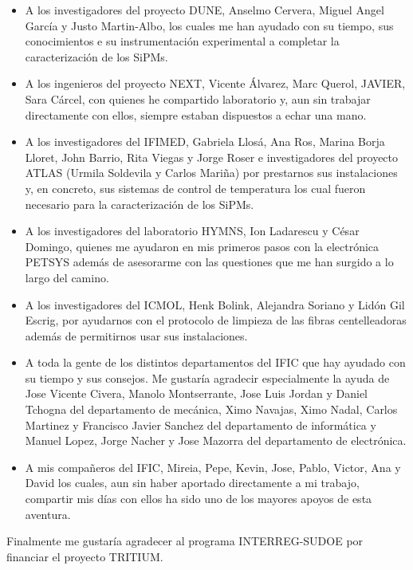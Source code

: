 \begin{itemize}

\item{} A los investigadores del proyecto DUNE, Anselmo Cervera, Miguel Angel García y Justo Martin-Albo, los cuales me han ayudado con su tiempo, sus conocimientos e su instrumentación experimental a completar la caracterización de los SiPMs. 

\item{} A los ingenieros del proyecto NEXT, Vicente Álvarez, Marc Querol, JAVIER, Sara Cárcel, con quienes he compartido laboratorio y, aun sin trabajar directamente con ellos, siempre estaban dispuestos a echar una mano. 

\item{} A los investigadores del IFIMED, Gabriela Llosá, Ana Ros, Marina Borja Lloret, John Barrio, Rita Viegas y Jorge Roser e investigadores del proyecto ATLAS (Urmila Soldevila y Carlos Mariña) por prestarnos sus instalaciones y, en concreto, sus sistemas de control de temperatura los cual fueron necesario para la caracterización de los SiPMs. 

\item{} A los investigadores del laboratorio HYMNS, Ion Ladarescu y César Domingo, quienes me ayudaron en mis primeros pasos con la electrónica PETSYS además de asesorarme con las questiones que me han surgido a lo largo del camino.

\item{} A los investigadores del ICMOL, Henk Bolink, Alejandra Soriano y Lidón Gil Escrig, por ayudarnos con el protocolo de limpieza de las fibras centelleadoras además de permitirnos usar sus instalaciones.

\item{} A toda la gente de los distintos departamentos del IFIC que hay ayudado con su tiempo y sus consejos. Me gustaría agradecir especialmente la ayuda de Jose Vicente Civera, Manolo Montserrante, Jose Luis Jordan y Daniel Tchogna del departamento de mecánica, Ximo Navajas, Ximo Nadal, Carlos Martinez y Francisco Javier Sanchez del departamento de informática y Manuel Lopez, Jorge Nacher y Jose Mazorra del departamento de electrónica.

\item{} A mis compañeros del IFIC, Mireia, Pepe, Kevin, Jose, Pablo, Victor, Ana y David los cuales, aun sin haber aportado directamente a mi trabajo, compartir mis días con ellos ha sido uno de los mayores apoyos de esta aventura.

\end{itemize} 

Finalmente me gustaría agradecer al programa INTERREG-SUDOE por financiar el proyecto TRITIUM.